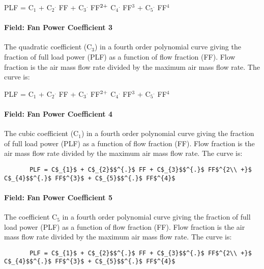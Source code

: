 PLF = C\(_{1}\) + C\(_{2}\)\(^{.}\) FF + C\(_{3}\)\(^{.}\) FF\(^{2\\ +}\) C\(_{4}\)\(^{.}\) FF\(^{3}\) + C\(_{5}\)\(^{.}\) FF\(^{4}\)

\paragraph{Field: Fan Power Coefficient 3}\label{field-fan-power-coefficient-3}

The quadratic coefficient (C\(_{3}\)) in a fourth order polynomial curve giving the fraction of full load power (PLF) as a function of flow fraction (FF). Flow fraction is the air mass flow rate divided by the maximum air mass flow rate. The curve is:

PLF = C\(_{1}\) + C\(_{2}\)\(^{.}\) FF + C\(_{3}\)\(^{.}\) FF\(^{2\\ +}\) C\(_{4}\)\(^{.}\) FF\(^{3}\) + C\(_{5}\)\(^{.}\) FF\(^{4}\)

\paragraph{Field: Fan Power Coefficient 4}\label{field-fan-power-coefficient-4}

The cubic coefficient (C\(_{1}\)) in a fourth order polynomial curve giving the fraction of full load power (PLF) as a function of flow fraction (FF). Flow fraction is the air mass flow rate divided by the maximum air mass flow rate. The curve is:

\begin{lstlisting}
       PLF = C$_{1}$ + C$_{2}$$^{.}$ FF + C$_{3}$$^{.}$ FF$^{2\\ +}$ C$_{4}$$^{.}$ FF$^{3}$ + C$_{5}$$^{.}$ FF$^{4}$
\end{lstlisting}

\paragraph{Field: Fan Power Coefficient 5}\label{field-fan-power-coefficient-5}

The coefficient C\(_{5}\) in a fourth order polynomial curve giving the fraction of full load power (PLF) as a function of flow fraction (FF). Flow fraction is the air mass flow rate divided by the maximum air mass flow rate. The curve is:

\begin{lstlisting}
       PLF = C$_{1}$ + C$_{2}$$^{.}$ FF + C$_{3}$$^{.}$ FF$^{2\\ +}$ C$_{4}$$^{.}$ FF$^{3}$ + C$_{5}$$^{.}$ FF$^{4}$
\end{lstlisting}


